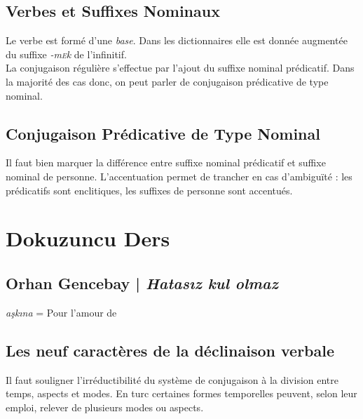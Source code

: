 \documentclass{cours}
\newcommand{\ch}{\c{s}}
\newcommand{\sce}{\textsc{e}}
\begin{document}
\subsection{Verbes et Suffixes Nominaux}
Le verbe est formé d'une \emph{base}. Dans les dictionnaires elle est donnée augmentée du suffixe \textit{-m\sce k} de l'infinitif.\\
La conjugaison régulière s'effectue par l'ajout du suffixe nominal prédicatif. Dans la majorité des cas donc, on peut parler de conjugaison prédicative de type nominal.

\subsection{Conjugaison Prédicative de Type Nominal}
Il faut bien marquer la différence entre suffixe nominal prédicatif et suffixe nominal de personne. L'accentuation permet de trancher en cas d'ambiguïté : les prédicatifs sont enclitiques, les suffixes de personne sont accentués.



\section{Dokuzuncu Ders}
\subsection{Orhan Gencebay | \textit{Hatas\i z kul olmaz}}
\textit{a\ch k\i na} = Pour l'amour de
\subsection{Les neuf caractères de la déclinaison verbale}
Il faut souligner l'irréductibilité du système de conjugaison à la division entre temps, aspects et modes. En turc certaines formes temporelles peuvent, selon leur emploi, relever de plusieurs modes ou aspects.
\end{document}

